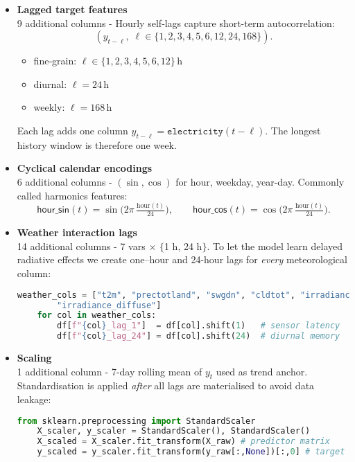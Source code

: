 \begin{itemize}
    \item \textbf{Lagged target features} \\
    9 additional columns - Hourly self‐lags capture short-term autocorrelation:
    \[
    (y_{t-\ell},\;\ell\in\{1,2,3,4,5,6,12,24,168\}).
    \]

    \begin{itemize}
        \item fine‐grain: $\ell\!\in\!\{1,2,3,4,5,6,12\}$\,h  
        \item diurnal:   $\ell=24$\,h  
        \item weekly:    $\ell=168$\,h
    \end{itemize}

    Each lag adds one column
    $y_{t-\ell}=\texttt{electricity}(t-\ell)$.  The longest history window is
    therefore one week.

    \item \textbf{Cyclical calendar encodings} \\
    6 additional columns - $(\sin,\cos)$ for hour, weekday, year-day. Commonly called harmonics features:
    \[
    \textsf{hour\_sin}(t)=\sin\!\bigl(2\pi\,\tfrac{\text{hour}(t)}{24}\bigr),\qquad
    \textsf{hour\_cos}(t)=\cos\!\bigl(2\pi\,\tfrac{\text{hour}(t)}{24}\bigr).
    \]
 
    \item \textbf{Weather interaction lags} \\
    14 additional columns - 7 vars $\times$ $\{$1 h, 24 h$\}$.
    To let the model learn delayed radiative effects we create one–hour and 24-hour lags for 
    \emph{every} meteorological column:
    \begin{lstlisting}[language=Python,caption={Python snippet -- weather lag construction}]
        weather_cols = ["t2m", "prectotland", "swgdn", "cldtot", "irradiance_direct", 
        "irradiance_diffuse"]
    for col in weather_cols:
        df[f"{col}_lag_1"]  = df[col].shift(1)   # sensor latency
        df[f"{col}_lag_24"] = df[col].shift(24)  # diurnal memory
    \end{lstlisting}

    \item \textbf{Scaling} \\
    1 additional column - 7-day rolling mean of $y_t$ used as trend anchor.
    Standardisation is applied \emph{after} all lags are materialised to avoid data leakage:

    \begin{lstlisting}[language=Python,caption={Python snippet -- feature/target scaling}]
    from sklearn.preprocessing import StandardScaler
    X_scaler, y_scaler = StandardScaler(), StandardScaler()
    X_scaled = X_scaler.fit_transform(X_raw) # predictor matrix
    y_scaled = y_scaler.fit_transform(y_raw[:,None])[:,0] # target vector
    \end{lstlisting}
\end{itemize}

